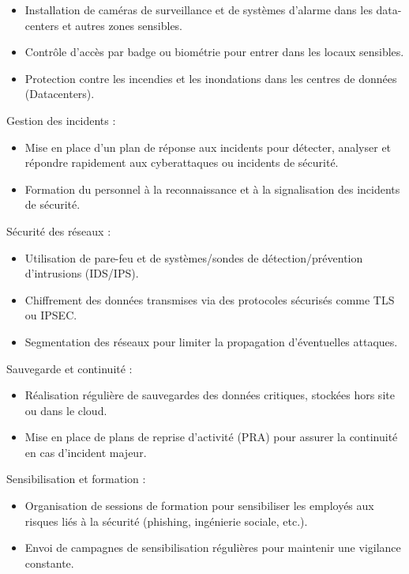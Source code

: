 \begin{itemize}
\item Installation de caméras de surveillance et de systèmes d’alarme dans les data-centers et autres zones sensibles.
\item Contrôle d’accès par badge ou biométrie pour entrer dans les locaux sensibles.
\item Protection contre les incendies et les inondations dans les centres de données (Datacenters).
\end{itemize}

Gestion des incidents :

\begin{itemize}
\item Mise en place d’un plan de réponse aux incidents pour détecter, analyser et répondre rapidement aux cyberattaques ou  incidents de sécurité.
\item Formation du personnel à la reconnaissance et à la signalisation des incidents de sécurité.
\end{itemize}

Sécurité des réseaux :

\begin{itemize}
\item Utilisation de pare-feu et de systèmes/sondes de détection/prévention d’intrusions (IDS/IPS).
\item Chiffrement des données transmises via des protocoles sécurisés comme TLS ou IPSEC.
\item Segmentation des réseaux pour limiter la propagation d’éventuelles attaques.
\end{itemize}

Sauvegarde et continuité :
\begin{itemize}
\item Réalisation régulière de sauvegardes des données critiques, stockées hors site ou dans le cloud.
\item Mise en place de plans de reprise d’activité (PRA) pour assurer la continuité en cas d’incident majeur.
 \end{itemize}

Sensibilisation et formation :
\begin{itemize}
\item Organisation de sessions de formation pour sensibiliser les employés aux risques liés à la sécurité (phishing, ingénierie sociale, etc.).
\item Envoi de campagnes de sensibilisation régulières pour maintenir une vigilance constante.
 \end{itemize}

